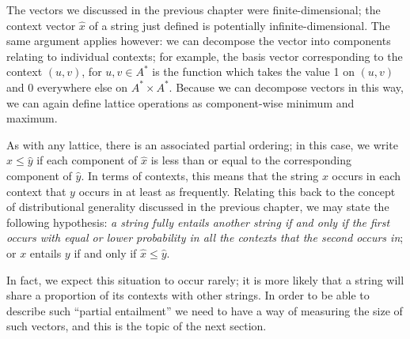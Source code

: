 \documentclass[11pt]{report}
\begin{document}
The vectors we discussed in the previous chapter were finite-dimensional; the context vector $\hat{x}$ of a string just defined is potentially infinite-dimensional. The same argument applies however: we can decompose the vector into components relating to individual contexts; for example, the basis vector corresponding to the context $(u,v)$, for $u,v \in A^*$ is the function which takes the value 1 on $(u,v)$ and 0 everywhere else on $A^*\times A^*$. Because we can decompose vectors in this way, we can again define lattice operations as component-wise minimum and maximum.

As with any lattice, there is an associated partial ordering; in this case, we write $\hat{x} \le \hat{y}$ if each component of $\hat{x}$ is less than or equal to the corresponding component of $\hat{y}$. In terms of contexts, this means that the string $x$ occurs in each context that $y$ occurs in at least as frequently. Relating this back to the concept of distributional generality discussed in the previous chapter, we may state the following hypothesis: \emph{a string fully entails another string if and only if the first occurs with equal or lower probability in all the contexts that the second occurs in}; or $x$ entails $y$ if and only if $\hat{x} \le \hat{y}$.

In fact, we expect this situation to occur rarely; it is more likely that a string will share a proportion of its contexts with other strings. In order to be able to describe such ``partial entailment'' we need to have a way of measuring the size of such vectors, and this is the topic of the next section.


\end{document}
